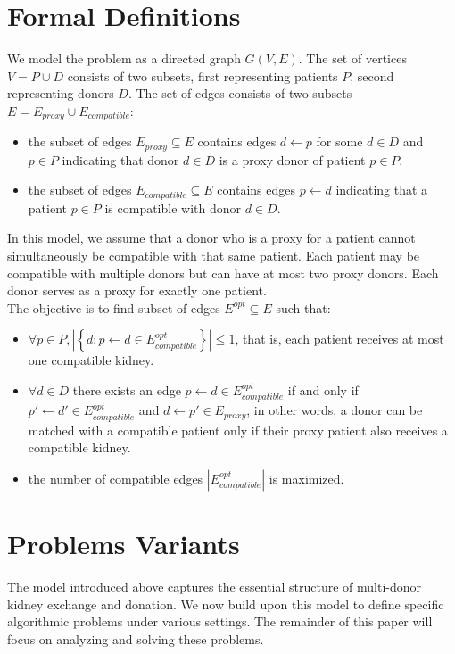 \section{Formal Definitions}
We model the problem as a directed graph $G(V, E)$. The set of vertices $V = P \cup D$ consists of two subsets, first representing patients $P$, second representing donors $D$. The set of edges consists of two subsets $E = E_{proxy} \cup E_{compatible}$:
\begin{itemize}
    \item the subset of edges $E_{proxy} \subseteq E$ contains edges $d \leftarrow p$ for some $d \in D$ and $p \in P$ indicating that donor $d \in D$ is a proxy donor of patient $p \in P$.
    \item the subset of edges $E_{compatible} \subseteq E$ contains edges $p \leftarrow d$ indicating that a patient $p \in P$ is compatible with donor $d \in D$.
\end{itemize}
In this model, we assume that a donor who is a proxy for a patient cannot simultaneously be compatible with that same patient. Each patient may be compatible with multiple donors but can have at most two proxy donors. Each donor serves as a proxy for exactly one patient.\\
The objective is to find subset of edges $E^{opt} \subseteq E$ such that:
\begin{itemize}
    \item $\forall p \in P, \left|\left\{ d : p \leftarrow d \in E^{opt}_{compatible} \right\}\right| \le 1$, that is, each patient receives at most one compatible kidney.
    \item $\forall d \in D$ there exists an edge $ p \leftarrow d \in E^{opt}_{compatible}$ if and only if $p' \leftarrow d' \in E^{opt}_{compatible}$ and $d \leftarrow p' \in E_{proxy}$, in other words, a donor can be matched with a compatible patient only if their proxy patient also receives a compatible kidney.
    \item the number of compatible edges $\left|E^{opt}_{compatible}\right|$ is maximized.
\end{itemize}

\section{Problems Variants}

The model introduced above captures the essential structure of multi-donor kidney exchange and donation. We now build upon this model to define specific algorithmic problems under various settings. The remainder of this paper will focus on analyzing and solving these problems.

